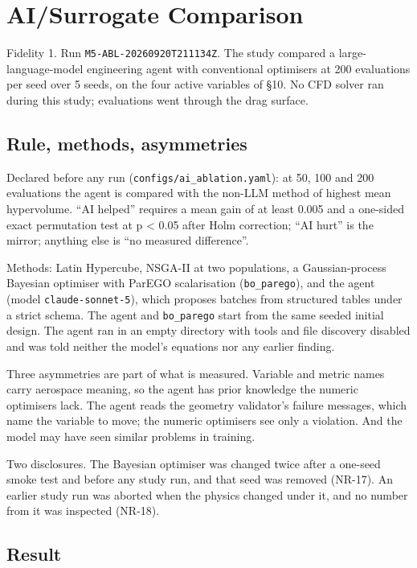 \documentclass[
  a4paper,
  11pt]{article}
\begin{document}
\section{AI/Surrogate Comparison}

Fidelity 1. Run
\texttt{M5-\allowbreak{}ABL-\allowbreak{}20260920T211134Z}. The study
compared a large-language-model engineering agent with conventional
optimisers at 200 evaluations per seed over 5 seeds, on the four active
variables of §10. No CFD solver ran during this study; evaluations went
through the drag surface.

\subsection{Rule, methods, asymmetries}

Declared before any run
(\texttt{configs/\allowbreak{}ai\_\allowbreak{}ablation.yaml}): at 50,
100 and 200 evaluations the agent is compared with the non-LLM method of
highest mean hypervolume. ``AI helped'' requires a mean gain of at least
0.005 and a one-sided exact permutation test at p \textless{} 0.05 after
Holm correction; ``AI hurt'' is the mirror; anything else is ``no
measured difference''.

Methods: Latin Hypercube, NSGA-II at two populations, a Gaussian-process
Bayesian optimiser with ParEGO scalarisation
(\texttt{bo\_\allowbreak{}parego}), and the agent (model
\texttt{claude-\allowbreak{}sonnet-\allowbreak{}5}), which proposes
batches from structured tables under a strict schema. The agent and
\texttt{bo\_\allowbreak{}parego} start from the same seeded initial
design. The agent ran in an empty directory with tools and file
discovery disabled and was told neither the model's equations nor any
earlier finding.

Three asymmetries are part of what is measured. Variable and metric
names carry aerospace meaning, so the agent has prior knowledge the
numeric optimisers lack. The agent reads the geometry validator's
failure messages, which name the variable to move; the numeric
optimisers see only a violation. And the model may have seen similar
problems in training.

Two disclosures. The Bayesian optimiser was changed twice after a
one-seed smoke test and before any study run, and that seed was removed
(NR-17). An earlier study run was aborted when the physics changed under
it, and no number from it was inspected (NR-18).

\subsection{Result}
\end{document}
